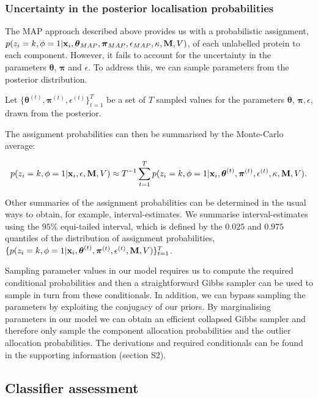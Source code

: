 \documentclass[12pt,english]{article}\usepackage[]{graphicx}\usepackage[]{color}
\begin{document}
\subsubsection*{Uncertainty in the posterior localisation probabilities}\label{section::MCMC}

The MAP approach described above provides us with a probabilistic
assignment,
$p(z_i = k, \phi = 1 | {\bf x}_i, \boldsymbol{\theta}_{MAP},
\boldsymbol{\pi}_{MAP} , \epsilon_{MAP},\kappa, {\bf M}, V)$, of each
unlabelled protein to each component.  However, it fails to account
for the uncertainty in the parameters $\boldsymbol{\theta}$,
$\boldsymbol{\pi}$ and $\epsilon$. To address this, we can sample
parameters from the posterior distribution.

Let
$\{\boldsymbol{\theta}^{(t)}, \boldsymbol{\pi}^{(t)},
\epsilon^{(t)}\}_{t=1}^T$ be a set of $T$ sampled values for the
parameters $\boldsymbol{\theta}$, $\boldsymbol{\pi}, \epsilon$, drawn
from the posterior.


The assignment probabilities can then be summarised by the Monte-Carlo
average:

\[p(z_i = k, \phi = 1 | {\bf x}_i, \epsilon, {\bf M}, V) \approx T^{-1}\sum_{t=1}^{T}p(z_i = k, \phi = 1 | {\bf x}_i, \boldsymbol{\theta}^{(t)}, \boldsymbol{\pi}^{(t)} , \epsilon^{(t)}, \kappa, {\bf M}, V).\]

Other summaries of the assignment probabilities can be determined in
the usual ways to obtain, for example, interval-estimates. We
summarise interval-estimates using the $95\%$ equi-tailed interval,
which is defined by the $0.025$ and $0.975$ quantiles of the
distribution of assignment probabilities,
$\{p(z_i = k, \phi = 1 | {\bf x}_i, \boldsymbol{\theta}^{(t)},
\boldsymbol{\pi}^{(t)} , \epsilon^{(t)}, {\bf M}, V) \}_{t=1}^T$.

Sampling parameter values in our model requires us to compute the
required conditional probabilities and then a straightforward Gibbs
sampler can be used to sample in turn from these conditionals. In
addition, we can bypass sampling the parameters by exploiting the
conjugacy of our priors. By marginalising parameters in our model we
can obtain an efficient collapsed Gibbs sampler and therefore only
sample the component allocation probabilities and the outlier
allocation probabilities. The derivations and required conditionals
can be found in the supporting information (section S2).

\subsection*{Classifier assessment}\label{section::assessment}
\end{document}
